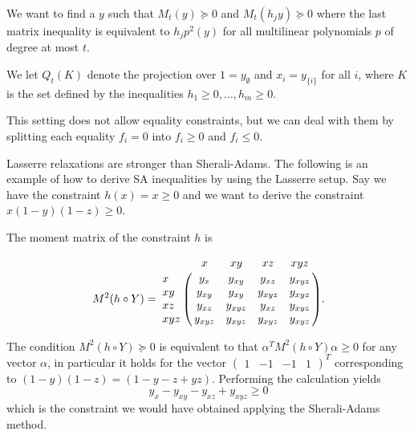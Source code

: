 \documentclass[a4paper,twoside,justified]{tufte-handout}
\begin{document}

We want to find a $y$ such that $M_t(y)\succeq0$ and $M_t(h_jy)\succeq0$ where the last matrix inequality is equivalent to $h_jp^2(y)$ for all multilinear polynomials $p$ of degree at most $t$.

We let $Q_t(K)$ denote the projection over $1=y_{\emptyset}$ and $x_i=y_{\{i\}}$ for all $i$, where $K$ is the set defined by the inequalities $h_1\geq0,\ldots,h_m\geq0$. 

This setting does not allow equality constraints, but we can deal with them by splitting each equality $f_i = 0$ into $f_i \geq 0$ and $f_i \leq 0$.

Lasserre relaxations are stronger than Sherali-Adams. The following is an example of how to derive SA inequalities by using the Lasserre setup. Say we have the constraint $h(x)= x \geq 0$ and we want to derive the constraint $x(1-y)(1-z) \geq 0$.

The moment matrix of the constraint $h$ is

\begin{equation}
M^2(h \circ Y)=
\bordermatrix{
~ & x & xy & xz & xyz \cr
x & y_{x} & y_{xy} & y_{xz} & y_{xyz}\cr
xy & y_{xy} & y_{xy} & y_{xyz} & y_{xyz} \cr
xz & y_{xz} & y_{xyz} & y_{xz} & y_{xyz} \cr
xyz & y_{xyz} & y_{xyz} & y_{xyz} & y_{xyz} \cr
}.
\end{equation}

The condition $M^2(h \circ Y) \succeq 0$ is equivalent to that $\alpha^T M^2(h \circ Y) \alpha \geq 0$ for any vector $\alpha$, in particular it holds for the vector $(\begin{matrix}1 & -1 & -1 & 1\end{matrix})^T$ corresponding to $(1-y)(1-z)=(1-y-z+yz)$. Performing the calculation yields
\begin{equation}
y_x - y_{xy} - y_{xz} + y_{xyz} \geq 0
\end{equation}
which is the constraint we would have obtained applying the Sherali-Adams method.






\end{document}
